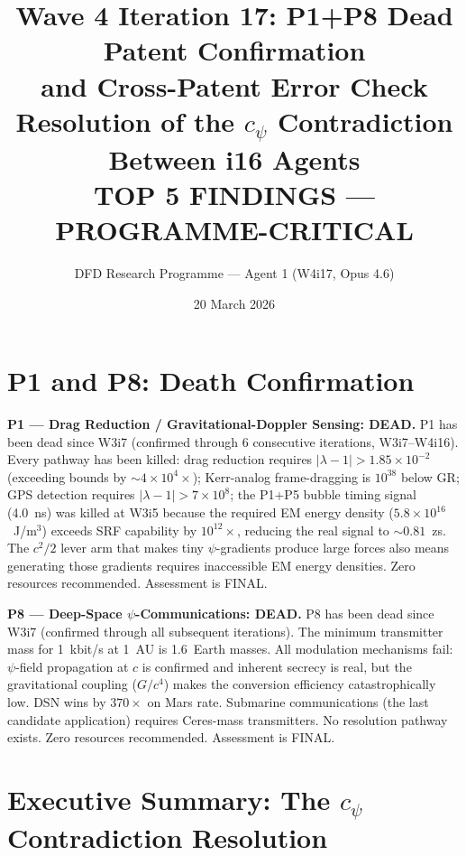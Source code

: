 \documentclass[11pt]{article}
\title{\textbf{Wave 4 Iteration 17: P1+P8 Dead Patent Confirmation\\
and Cross-Patent Error Check}\\[8pt]
{\large Resolution of the $c_\psi$ Contradiction Between i16 Agents}\\[4pt]
{\normalsize TOP 5 FINDINGS --- PROGRAMME-CRITICAL}}
\author{DFD Research Programme --- Agent 1 (W4i17, Opus 4.6)}
\date{20 March 2026}
\newcommand{\ee}[1]{\times 10^{#1}}
\newcommand{\lbone}{|\lambda - 1|}
\begin{document}
\maketitle

\section*{P1 and P8: Death Confirmation}

\textbf{P1 --- Drag Reduction / Gravitational-Doppler Sensing: DEAD.}
P1 has been dead since W3i7 (confirmed through 6 consecutive iterations, W3i7--W4i16). Every pathway has been killed: drag reduction requires $\lbone > 1.85\ee{-2}$ (exceeding bounds by $\sim 4\ee{4}\times$); Kerr-analog frame-dragging is $10^{38}$ below GR; GPS detection requires $\lbone > 7\ee{8}$; the P1+P5 bubble timing signal (4.0~ns) was killed at W3i5 because the required EM energy density ($5.8\ee{16}$~J/m$^3$) exceeds SRF capability by $10^{12}\times$, reducing the real signal to $\sim 0.81$~zs. The $c^2/2$ lever arm that makes tiny $\psi$-gradients produce large forces also means generating those gradients requires inaccessible EM energy densities. Zero resources recommended. Assessment is FINAL.

\textbf{P8 --- Deep-Space $\psi$-Communications: DEAD.}
P8 has been dead since W3i7 (confirmed through all subsequent iterations). The minimum transmitter mass for 1~kbit/s at 1~AU is 1.6~Earth masses. All modulation mechanisms fail: $\psi$-field propagation at $c$ is confirmed and inherent secrecy is real, but the gravitational coupling ($G/c^4$) makes the conversion efficiency catastrophically low. DSN wins by $370\times$ on Mars rate. Submarine communications (the last candidate application) requires Ceres-mass transmitters. No resolution pathway exists. Zero resources recommended. Assessment is FINAL.

\newpage

\section*{Executive Summary: The $c_\psi$ Contradiction Resolution}
\end{document}
